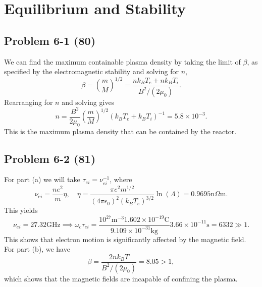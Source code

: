 \chapter{Equilibrium and Stability}
\label{ch:Six}

\section*{Problem 6-1 (80)}
\label{sec:6-1}
We can find the maximum containable plasma density by taking the limit of \(\beta \), as specified by the electromagnetic stability and solving for \(n\),
\begin{equation*}
	\beta = \left(\dfrac{m}{M}\right)^{1/2} = \dfrac{nk_BT_e + nk_BT_i}{B^2/(2\mu_0)}.
\end{equation*}
Rearranging for \(n\) and solving gives
\begin{equation*}
	n = \dfrac{B^2}{2\mu_0}\left(\dfrac{m}{M}\right)^{1/2}\left(k_BT_e + k_BT_i\right)^{-1} = 5.8\times 10^{-3}.
\end{equation*}
This is the maximum plasma density that can be contained by the reactor.

\section*{Problem 6-2 (81)}
\label{sec:6-2}
For part (a) we will take \(\tau_{ei} = \nu_{ei}^{-1} \), where
\begin{equation*}
	\nu_{ei} = \dfrac{ne^2}{m}\eta, \quad \eta = \dfrac{\pi e^2 m^{1/2}}{(4\pi \epsilon_0)^2 (k_BT_e)^{3/2}}\ln(\Lambda) = 0.9695\text{n}\Omega\text{m}.
\end{equation*}
This yields
\begin{equation*}
	\nu_{ei} = 27.32\text{GHz} \implies \omega_c\tau_{ei} = \dfrac{10^{27}\text{m}^{-3}1.602\times10^{-19}\text{C}}{9.109\times10^{-31}\text{kg}}3.66 \times 10^{-11}\text{s} = 6332 \gg 1.
\end{equation*}
This shows that electron motion is significantly affected by the magnetic field. For part (b), we have 
\begin{equation*}
	\beta = \dfrac{2nk_BT}{B^2/(2\mu_0)} = 8.05 > 1,
\end{equation*}
which shows that the magnetic fields are incapable of confining the plasma. %

